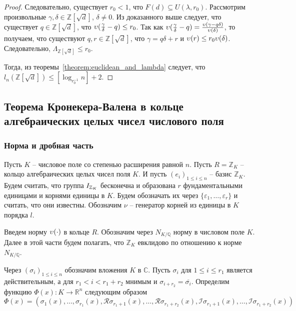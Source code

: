 \documentclass[_00_dissertation.tex]{subfiles}
\begin{document}
\begin{proof}
    Следовательно, существует $r_0 < 1$, что $F(d) \subseteq U(\lambda, r_0)$.
    Рассмотрим произвольные $\gamma, \delta \in \mathbb{Z}[\sqrt{d}]$, $\delta \neq 0$.
    Из доказанного выше следует, что существует $q \in \mathbb{Z}[\sqrt{d}]$, что $\upsilon(\frac{\gamma}{\delta} - q) \le r_0$.
    Так как $\upsilon(\frac{\gamma}{\delta} - q) = \frac{\upsilon(\gamma - q\delta)}{\upsilon(\delta)}$, то получаем, что существуют $q, r \in \mathbb{Z}[\sqrt{d}]$, что $\gamma = q\delta + r$ и $\upsilon(r) \le r_0 \upsilon(\delta)$.
    Следовательно, $\Lambda_{\mathbb{Z}[\sqrt{d}]} \le r_0$.

    Тогда, из теоремы~\ref{theorem:euclidean_and_lambda} следует, что $l_n(\mathbb{Z}[\sqrt{d}]) \le [\log_{r_0^{-1}} n] + 2$.
\end{proof}

\subsection{Теорема Кронекера-Валена в кольце алгебраических целых чисел числового поля}

\subsubsection{Норма и дробная часть}

Пусть $K$ -- числовое поле со степенью расширения равной $n$.
Пусть $R = \mathbb{Z}_K$ -- кольцо алгебраических целых чисел поля $K$.
И пусть $(e_i)_{1 \le i \le n}$ -- базис $\mathbb{Z}_K$.
Будем считать, что группа $I_{\mathbb{Z}_K}$ бесконечна и образована $r$ фундаментальными единицами и корнями единицы в $K$.
Будем обозначать их через $\{\varepsilon_1, \dots, \varepsilon_r\}$ и считать, что они известны.
Обозначим $\nu$ -- генератор корней из единицы в $K$ порядка $l$.

Введем норму $\upsilon(\cdot)$ в кольце $R$.
Обозначим через $N_{K/\mathbb{Q}}$ норму в числовом поле $K$.
Далее в этой части будем полагать, что $\mathbb{Z}_K$ евклидово по отношению к норме $N_{K/\mathbb{Q}}$.

Через $(\sigma_i)_{1 \le i \le n}$ обозначим вложения $K$ в $\mathbb{C}$.
Пусть $\sigma_i$ для $1 \le i \le r_1$ является действительным, а для $r_1 < i < r_1 + r_2$ мнимым и $\sigma_{i+r_2} = \overline{\sigma_{i}}$.
Определим функцию $\Phi(x): K \to \mathbb{R}^n$ следующим образом
\begin{equation*}
	\Phi(x) = \left(
		\sigma_1(x), \ldots, \sigma_{r_1}(x),
		\mathcal{R}\sigma_{r_1 + 1}(x), \ldots, \mathcal{R}\sigma_{r_1 + r_2}(x),
		\mathcal{I}\sigma_{r_1 + 1}(x), \ldots, \mathcal{I}\sigma_{r_1 + r_2}(x)
	\right)
\end{equation*}
\end{document}

